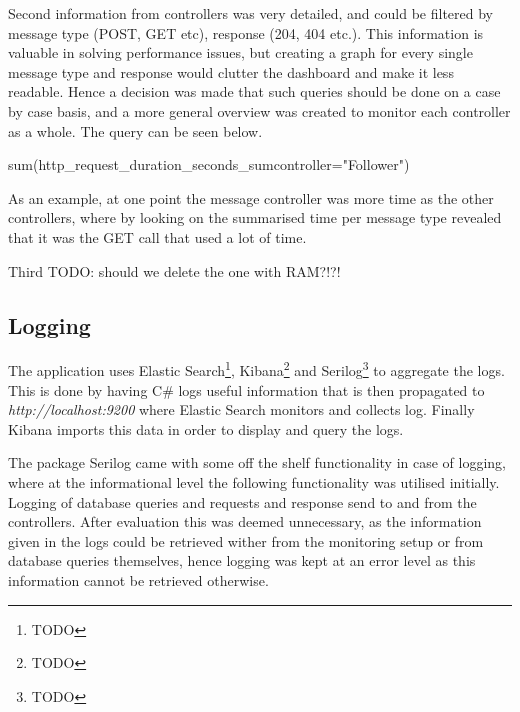 \documentclass[report/main.tex]{subfiles}
\begin{document}
                Second information from controllers was very detailed, and could be filtered by message type (POST, GET etc), response (204, 404 etc.). This information is valuable in solving performance issues, but creating a graph for every single message type and response would clutter the dashboard and make it less readable. Hence a decision was made that such queries should be done on a case by case basis, and a more general overview was created to monitor each controller as a whole. The query can be seen below.
                
                \begin{center}
                    sum(http\_request\_duration\_seconds\_sum{controller="Follower"})
                \end{center}
                
                As an example, at one point the message controller was more time as the other controllers, where by looking on the summarised time per message type revealed that it was the GET call that used a lot of time.
                
                Third TODO: should we delete the one with RAM?!?!
                

        \subsection{Logging}
            \label{SubSec:logging}
            The application uses Elastic Search\footnote{TODO}, Kibana\footnote{TODO} and Serilog\footnote{TODO} to aggregate the logs. This is done by having C# logs useful information that is then propagated to \textit{http://localhost:9200} where Elastic Search monitors and collects log. Finally Kibana imports this data in order to display and query the logs.
            
            The package Serilog came with some off the shelf functionality in case of logging, where at the informational level the following functionality was utilised initially. Logging of database queries and requests and response send to and from the controllers. After evaluation this was deemed unnecessary, as the information given in the logs could be retrieved wither from the monitoring setup or from database queries themselves, hence logging was kept at an error level as this information cannot be retrieved otherwise.
\end{document}
